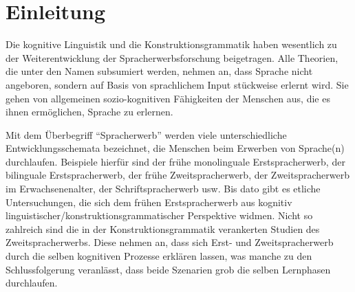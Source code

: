 \section{Einleitung}

\begin{comment}
* ca 3/4 Seiten
* Untersuchungsgegenstand
* Erkenntnisinteresse
* Forschungsstand
* Vorgehensweise: also Section 2 macht blabla, Section 3 blablup, ....
* Ergebnisse können/sollen angedeuten werden
\end{comment}


Die kognitive Linguistik und die Konstruktionsgrammatik haben wesentlich zu der Weiterentwicklung der Spracherwerbsforschung beigetragen.
Alle Theorien, die unter den Namen subsumiert werden, nehmen an, dass Sprache nicht angeboren, sondern auf Basis von sprachlichem Input stückweise erlernt wird.
Sie gehen von allgemeinen sozio-kognitiven Fähigkeiten der Menschen aus, die es ihnen ermöglichen, Sprache zu erlernen.

Mit dem Überbegriff ``Spracherwerb'' werden viele unterschiedliche Entwicklungsschemata bezeichnet, die Menschen beim Erwerben von Sprache(n) durchlaufen.
Beispiele hierfür sind der frühe monolinguale Erstspracherwerb, der bilinguale Erstspracherwerb, der frühe Zweitspracherwerb, der Zweitspracherwerb im Erwachsenenalter, der Schriftspracherwerb usw.
Bis dato gibt es etliche Untersuchungen, die sich dem frühen Erstspracherwerb aus kognitiv linguistischer/konstruktionsgrammatischer Perspektive widmen.
Nicht so zahlreich sind die in der Konstruktionsgrammatik verankerten Studien des Zweitspracherwerbs.
Diese nehmen an, dass sich Erst- und Zweitspracherwerb durch die selben kognitiven Prozesse erklären lassen, was manche zu den Schlussfolgerung veranlässt, dass beide Szenarien grob die selben Lernphasen durchlaufen.

